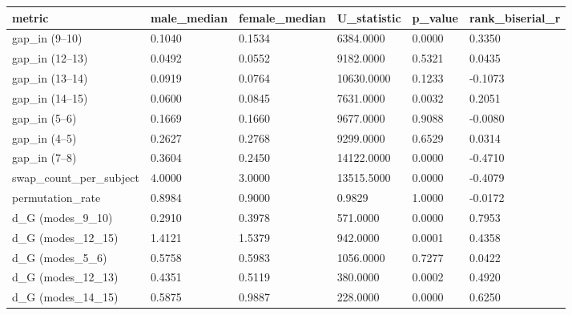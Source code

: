 \begin{tabular}{llllll}
\toprule
metric & male\_median & female\_median & U\_statistic & p\_value & rank\_biserial\_r \\
\midrule
gap\_in (9--10) & 0.1040 & 0.1534 & 6384.0000 & 0.0000 & 0.3350 \\
gap\_in (12--13) & 0.0492 & 0.0552 & 9182.0000 & 0.5321 & 0.0435 \\
gap\_in (13--14) & 0.0919 & 0.0764 & 10630.0000 & 0.1233 & -0.1073 \\
gap\_in (14--15) & 0.0600 & 0.0845 & 7631.0000 & 0.0032 & 0.2051 \\
gap\_in (5--6) & 0.1669 & 0.1660 & 9677.0000 & 0.9088 & -0.0080 \\
gap\_in (4--5) & 0.2627 & 0.2768 & 9299.0000 & 0.6529 & 0.0314 \\
gap\_in (7--8) & 0.3604 & 0.2450 & 14122.0000 & 0.0000 & -0.4710 \\
swap\_count\_per\_subject & 4.0000 & 3.0000 & 13515.5000 & 0.0000 & -0.4079 \\
permutation\_rate & 0.8984 & 0.9000 & 0.9829 & 1.0000 & -0.0172 \\
d\_G (modes\_9\_10) & 0.2910 & 0.3978 & 571.0000 & 0.0000 & 0.7953 \\
d\_G (modes\_12\_15) & 1.4121 & 1.5379 & 942.0000 & 0.0001 & 0.4358 \\
d\_G (modes\_5\_6) & 0.5758 & 0.5983 & 1056.0000 & 0.7277 & 0.0422 \\
d\_G (modes\_12\_13) & 0.4351 & 0.5119 & 380.0000 & 0.0002 & 0.4920 \\
d\_G (modes\_14\_15) & 0.5875 & 0.9887 & 228.0000 & 0.0000 & 0.6250 \\
\bottomrule
\end{tabular}
